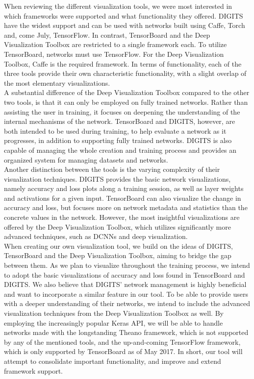 When reviewing the different visualization tools, we were most interested in which frameworks were supported and what functionality they offered. DIGITS have the widest support and can be used with networks built using Caffe, Torch and, come July, TensorFlow. In contrast, TensorBoard and the Deep Visualization Toolbox are restricted to a single framework each. To utilize TensorBoard, networks must use TensorFlow. For the Deep Visualization Toolbox, Caffe is the required framework. In terms of functionality, each of the three tools provide their own characteristic functionality, with a slight overlap of the most elementary visualizations. \\

\noindent A substantial difference of the Deep Visualization Toolbox compared to the other two tools, is that it can only be employed on fully trained networks. Rather than assisting the user in training, it focuses on deepening the understanding of the internal mechanisms of the network. TensorBoard and DIGITS, however, are both intended to be used during training, to help evaluate a network as it progresses, in addition to supporting fully trained networks. DIGITS is also capable of managing the whole creation and training process and provides an organized system for managing datasets and networks. \\

\noindent Another distinction between the tools is the varying complexity of their visualization techniques. DIGITS provides the basic network visualizations, namely accuracy and loss plots along a training session, as well as layer weights and activations for a given input. TensorBoard can also visualize the change in accuracy and loss, but focuses more on network metadata and statistics than the concrete values in the network. However, the most insightful visualizations are offered by the Deep Visualization Toolbox, which utilizes significantly more advanced techniques, such as DCNNs and deep visualization. \\

\noindent When creating our own visualization tool, we build on the ideas of DIGITS, TensorBoard and the Deep Visualization Toolbox, aiming to bridge the gap between them. As we plan to visualize throughout the training process, we intend to adopt the basic visualizations of accuracy and loss found in TensorBoard and DIGITS. We also believe that DIGITS' network management is highly beneficial and want to incorporate a similar feature in our tool. To be able to provide users with a deeper understanding of their networks, we intend to include the advanced visualization techniques from the Deep Visualization Toolbox as well. By employing the increasingly popular Keras API, we will be able to handle networks made with the longstanding Theano framework, which is not supported by any of the mentioned tools, and the up-and-coming TensorFlow framework, which is only supported by TensorBoard as of May 2017. In short, our tool will attempt to consolidate important functionality, and improve and extend framework support.

